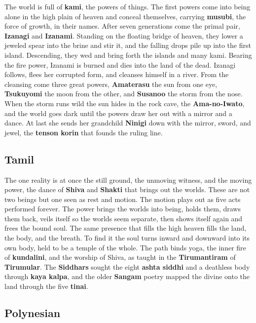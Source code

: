 The world is full of \textbf{kami}, the powers of things. The first powers come into being alone in the high plain of heaven and conceal themselves, carrying \textbf{musubi}, the force of growth, in their names. After seven generations come the primal pair, \textbf{Izanagi} and \textbf{Izanami}. Standing on the floating bridge of heaven, they lower a jeweled spear into the brine and stir it, and the falling drops pile up into the first island. Descending, they wed and bring forth the islands and many kami. Bearing the fire power, Izanami is burned and dies into the land of the dead. Izanagi follows, flees her corrupted form, and cleanses himself in a river. From the cleansing come three great powers, \textbf{Amaterasu} the sun from one eye, \textbf{Tsukuyomi} the moon from the other, and \textbf{Susanoo} the storm from the nose. When the storm runs wild the sun hides in the rock cave, the \textbf{Ama-no-Iwato}, and the world goes dark until the powers draw her out with a mirror and a dance. At last she sends her grandchild \textbf{Ninigi} down with the mirror, sword, and jewel, the \textbf{tenson korin} that founds the ruling line.

\subsection{Tamil}

The one reality is at once the still ground, the unmoving witness, and the moving power, the dance of \textbf{Shiva} and \textbf{Shakti} that brings out the worlds. These are not two beings but one seen as rest and motion. The motion plays out as five acts performed forever. The power brings the worlds into being, holds them, draws them back, veils itself so the worlds seem separate, then shows itself again and frees the bound soul. The same presence that fills the high heaven fills the land, the body, and the breath. To find it the soul turns inward and downward into its own body, held to be a temple of the whole. The path binds yoga, the inner fire of \textbf{kundalini}, and the worship of Shiva, as taught in the \textbf{Tirumantiram} of \textbf{Tirumular}. The \textbf{Siddhars} sought the eight \textbf{ashta siddhi} and a deathless body through \textbf{kaya kalpa}, and the older \textbf{Sangam} poetry mapped the divine onto the land through the five \textbf{tinai}.

\subsection{Polynesian}


